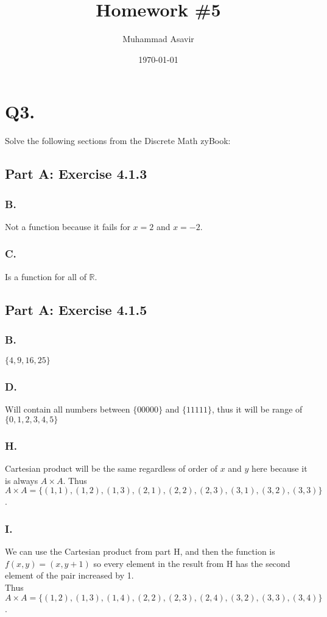 \documentclass[titlepage]{article}\pagestyle{empty}
\author{Muhammad Asavir}
\title{Homework \#5}
\date{\today}
\begin{document}
\maketitle

\pagebreak
\section*{Q3.} Solve the following sections from the Discrete Math zyBook:
\subsection*{Part A: Exercise 4.1.3} 
\subsubsection*{B.} Not a function because it fails for $x = 2$ and $x = -2$.
\subsubsection*{C.} Is a function for all of $\mathbb{R}$.
\subsection*{Part A: Exercise 4.1.5} 
\subsubsection*{B.} 
$\{4,9,16,25\}$
\subsubsection*{D.}
Will contain all numbers between $\{00000\}$ and $\{11111\}$, thus it will be range of $\{0, 1, 2, 3, 4, 5\}$
\subsubsection*{H.} 
Cartesian product will be the same regardless of order of $x$ and $y$ here because it is always $A \times A$. Thus $A \times A = \{(1,1),(1,2),(1,3),(2,1),(2,2),(2,3),(3,1),(3,2),(3,3)\}$.
\subsubsection*{I.} 
We can use the Cartesian product from part H, and then the function is $f(x, y) = (x, y+1)$ so every element in the result from H has the second element of the pair increased by 1.\\Thus $A \times A = \{(1,2),(1,3),(1,4),(2,2),(2,3),(2,4),(3,2),(3,3),(3,4)\}$.
\end{document}
